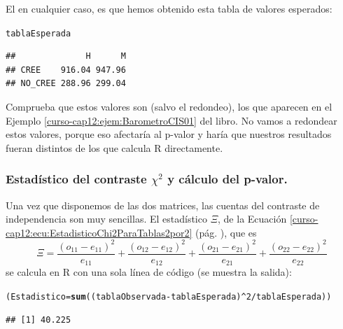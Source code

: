 \documentclass[10pt,a4paper]{article}\usepackage[]{graphicx}\usepackage[]{color}
\makeatletter
\newcommand{\hlnum}[1]{\textcolor[rgb]{0.686,0.059,0.569}{#1}}%
\newcommand{\hlopt}[1]{\textcolor[rgb]{0,0,0}{#1}}%
\newcommand{\hlstd}[1]{\textcolor[rgb]{0.345,0.345,0.345}{#1}}%
\newcommand{\hlkwb}[1]{\textcolor[rgb]{0.69,0.353,0.396}{#1}}%
\newcommand{\hlkwd}[1]{\textcolor[rgb]{0.737,0.353,0.396}{\textbf{#1}}}%
\newenvironment{kframe}{%
 \def\at@end@of@kframe{}%
 \ifinner\ifhmode%
  \def\at@end@of@kframe{\end{minipage}}%
  \begin{minipage}{\columnwidth}%
 \fi\fi%
 \def\FrameCommand##1{\hskip\@totalleftmargin \hskip-\fboxsep
 \colorbox{shadecolor}{##1}\hskip-\fboxsep
     \hskip-\linewidth \hskip-\@totalleftmargin \hskip\columnwidth}%
 \MakeFramed {\advance\hsize-\width
   \@totalleftmargin\z@ \linewidth\hsize
   \@setminipage}}%
 {\par\unskip\endMakeFramed%
 \at@end@of@kframe}
\newenvironment{knitrout}{}{} %
\newcounter {cont01}
\makeatother
\begin{document}
El  en cualquier caso, es que hemos obtenido esta tabla de valores esperados:

\begin{knitrout}
\color{fgcolor}\begin{kframe}
\begin{alltt}
\hlstd{tablaEsperada}
\end{alltt}
\begin{verbatim}
##              H      M
## CREE    916.04 947.96
## NO_CREE 288.96 299.04
\end{verbatim}
\end{kframe}
\end{knitrout}
Comprueba que estos valores son (salvo el redondeo), los que aparecen en el Ejemplo \ref{curso-cap12:ejem:BarometroCIS01} del libro. No vamos a redondear estos valores, porque eso afectaría al p-valor y haría que nuestros resultados fueran distintos de los que calcula R directamente.

\subsubsection*{Estadístico del contraste $\chi^2$ y cálculo del p-valor.}
\label{tut12:subsubsec:EstadisticoPValorContrasteIndependencia}

Una vez que disponemos de las dos matrices, las cuentas del contraste de independencia son muy sencillas. El estadístico $\Xi$, de la Ecuación \ref{curso-cap12:ecu:EstadisticoChi2ParaTablas2por2} (pág. \pageref{curso-cap12:ecu:EstadisticoChi2ParaTablas2por2}), que es
\[
\Xi=\dfrac{(o_{11}-e_{11})^2}{e_{11}}+\dfrac{(o_{12}-e_{12})^2}{e_{12}}+\dfrac{(o_{21}-e_{21})^2}{e_{21}}+\dfrac{(o_{22}-e_{22})^2}{e_{22}}
\]
se calcula en R con una sola línea de código (se muestra la salida):

\begin{knitrout}
\color{fgcolor}\begin{kframe}
\begin{alltt}
\hlstd{(Estadistico} \hlkwb{=} \hlkwd{sum}\hlstd{((tablaObservada} \hlopt{-} \hlstd{tablaEsperada)}\hlopt{^}\hlnum{2} \hlopt{/} \hlstd{tablaEsperada))}
\end{alltt}
\begin{verbatim}
## [1] 40.225
\end{verbatim}
\end{kframe}
\end{knitrout}
\end{document}
